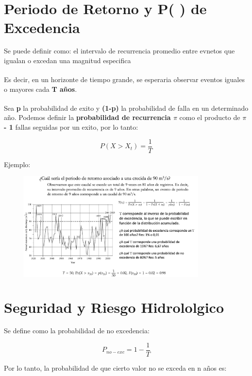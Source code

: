 \section{Periodo de Retorno y P( ) de Excedencia}

Se puede definir como: el intervalo de recurrencia promedio entre evnetos que igualan o excedan una magnitud especifica
\\ \\
Es decir, en un horizonte de tiempo grande, se esperaria observar eventos iguales o mayores cada \textbf{T años}.
\\ \\
Sea \textbf{p} la probabilidad de exito y \textbf{(1-p)} la probabilidad de falla en un determinado año. Podemos definir la \textbf{probabilidad de recurrencia $\pi$} como el producto de \textbf{$\pi$ - 1} fallas seguidas por un exito, por lo tanto:

\begin{equation}
    P(X > X_t) = \frac{1}{T}
\end{equation}

Ejemplo:

\begin{figure}[H]
    \centering
    \includegraphics[width=0.85\textwidth]{imagenes/retorno.png}
    \label{fig:periodo_retorno}
\end{figure}

\section{Seguridad y Riesgo Hidrololgico}

Se define como la probabilidad de no excedencia:

\begin{equation}
    P_{no-exc} = 1 - \frac{1}{T}
\end{equation}

Por lo tanto, la probabilidad de que cierto valor no se exceda en n años es:

